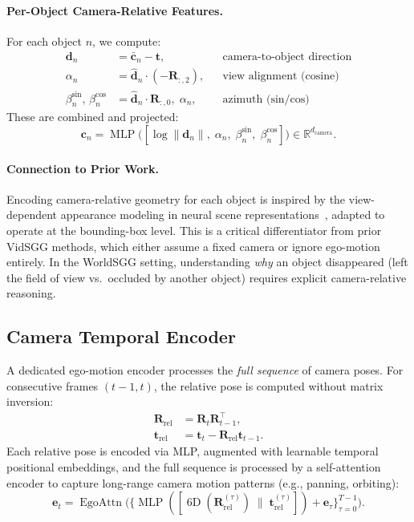\documentclass[runningheads]{llncs}
\newcommand{\mR}{\mathbb{R}}
\newcommand{\op}[1]{\operatorname{#1}}
\newcommand{\mat}[1]{\bm{#1}}
\begin{document}
\paragraph{Per-Object Camera-Relative Features.}  For each object $n$, we compute:
\begin{align}
    \mat{d}_n &= \bar{\mat{c}}_n - \mat{t}, & &\text{camera-to-object direction} \label{eq:cam_dir} \\
    \alpha_n &= \hat{\mat{d}}_n \cdot (-\mat{R}_{:,2}), & &\text{view alignment (cosine)} \label{eq:view_align} \\
    \beta_n^{\sin},\,\beta_n^{\cos} &= \hat{\mat{d}}_n \cdot \mat{R}_{:,0},\; \alpha_n, & &\text{azimuth (sin/cos)} \label{eq:azimuth}
\end{align}
These are combined and projected:
\begin{equation}
    \mat{c}_n = \op{MLP}\bigl([\log\|\mat{d}_n\|,\;\alpha_n,\;\beta_n^{\sin},\;\beta_n^{\cos}]\bigr) \in \mR^{d_{\text{camera}}}.
    \label{eq:cam_per_obj}
\end{equation}

\paragraph{Connection to Prior Work.}  Encoding camera-relative geometry for each object is inspired by the view-dependent appearance modeling in neural scene representations~\cite{sitzmann2019scene,mildenhall2021nerf}, adapted to operate at the bounding-box level.  This is a critical differentiator from prior VidSGG methods, which either assume a fixed camera or ignore ego-motion entirely.  In the WorldSGG setting, understanding \emph{why} an object disappeared (left the field of view vs.\ occluded by another object) requires explicit camera-relative reasoning.


\subsection{Camera Temporal Encoder}
\label{sec:cam_temporal}

A dedicated ego-motion encoder processes the \emph{full sequence} of camera poses.  For consecutive frames $(t{-}1, t)$, the relative pose is computed without matrix inversion:
\begin{align}
    \mat{R}_{\text{rel}} &= \mat{R}_t \mat{R}_{t-1}^{\!\top}, \label{eq:rel_rot} \\
    \mat{t}_{\text{rel}} &= \mat{t}_t - \mat{R}_{\text{rel}}\mat{t}_{t-1}. \label{eq:rel_trans}
\end{align}
Each relative pose is encoded via MLP, augmented with learnable temporal positional embeddings, and the full sequence is processed by a self-attention encoder to capture long-range camera motion patterns (e.g., panning, orbiting):
\begin{equation}
    \mat{e}_t = \op{EgoAttn}\bigl(\{\op{MLP}([\op{6D}(\mat{R}_{\text{rel}}^{(\tau)}) \;\|\; \mat{t}_{\text{rel}}^{(\tau)}]) + \mat{e}_{\tau}\}_{\tau=0}^{T-1}\bigr).
    \label{eq:ego_motion}
\end{equation}
\end{document}
